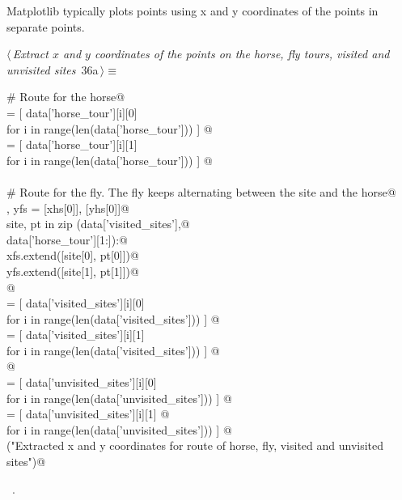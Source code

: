 \documentclass[11.5pt]{report}
\begin{document}
\vspace{-0.8cm}\newchunk Matplotlib typically plots points using x and y coordinates of the points in separate points. 
\begin{flushleft} \small\label{scrap32}\raggedright\small
{} $\langle\,${\itshape Extract $x$ and $y$ coordinates of the points on the horse, fly tours, visited and unvisited sites}\nobreak\ {\footnotesize {36a}}$\,\rangle\equiv$
\vspace{-1ex}
\begin{list}{}{} \item
\mbox{}\verb@# Route for the horse@\\
\mbox{}\verb@xhs = [ data['horse_tour'][i][0] \@\\
\mbox{}\verb@          for i in range(len(data['horse_tour']))  ]    @\\
\mbox{}\verb@yhs = [ data['horse_tour'][i][1] \@\\
\mbox{}\verb@          for i in range(len(data['horse_tour']))  ]    @\\
\mbox{}\verb@@\\
\mbox{}\verb@# Route for the fly. The fly keeps alternating between the site and the horse@\\
\mbox{}\verb@xfs , yfs = [xhs[0]], [yhs[0]]@\\
\mbox{}\verb@for site, pt in zip (data['visited_sites'],@\\
\mbox{}\verb@                     data['horse_tour'][1:]):@\\
\mbox{}\verb@    xfs.extend([site[0], pt[0]])@\\
\mbox{}\verb@    yfs.extend([site[1], pt[1]])@\\
\mbox{}\verb@        @\\
\mbox{}\verb@xvisited = [ data['visited_sites'][i][0] \@\\
\mbox{}\verb@               for i in range(len(data['visited_sites']))  ]    @\\
\mbox{}\verb@yvisited = [ data['visited_sites'][i][1] \@\\
\mbox{}\verb@               for i in range(len(data['visited_sites']))  ]    @\\
\mbox{}\verb@    @\\
\mbox{}\verb@xunvisited = [ data['unvisited_sites'][i][0] \@\\
\mbox{}\verb@                 for i in range(len(data['unvisited_sites']))  ]    @\\
\mbox{}\verb@yunvisited = [ data['unvisited_sites'][i][1] @\\
\mbox{}\verb@                 for i in range(len(data['unvisited_sites'])) ]    @\\
\mbox{}\verb@debug("Extracted x and y coordinates for route of horse, fly, visited and unvisited sites")@\\
\mbox{}\verb@@{\NWsep}
\end{list}
\vspace{-1.5ex}
\footnotesize
\begin{list}{}{\setlength{\itemsep}{-\parsep}\setlength{\itemindent}{-\leftmargin}}
\item \NWtxtMacroRefIn\ .


\end{list}
\end{flushleft}
\end{document}
